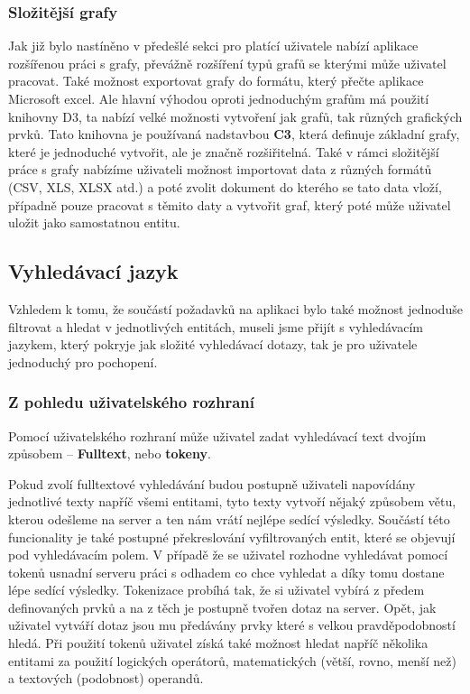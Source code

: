 \subsubsection{Složitější grafy}
\par Jak již bylo nastíněno v předešlé sekci pro platící uživatele nabízí aplikace rozšířenou práci s grafy, převážně rozšíření typů grafů se kterými může uživatel pracovat. Také možnost exportovat grafy do formátu, který přečte aplikace Microsoft excel. Ale hlavní výhodou oproti jednoduchým grafům má použití knihovny D3, ta nabízí velké možnosti vytvoření jak grafů, tak různých grafických prvků. Tato knihovna je používaná nadstavbou \textbf{C3}, která definuje základní grafy, které je jednoduché vytvořit, ale je značně rozšiřitelná. Také v rámci složitější práce s grafy nabízíme uživateli možnost importovat data z různých formátů (CSV, XLS, XLSX atd.) a poté zvolit dokument do kterého se tato data vloží, případně pouze pracovat s těmito daty a vytvořit graf, který poté může uživatel uložit jako samostatnou entitu.

\subsection{Vyhledávací jazyk}
\par Vzhledem k tomu, že součástí požadavků na aplikaci bylo také možnost jednoduše filtrovat a hledat v jednotlivých entitách, museli jsme přijít s vyhledávacím jazykem, který pokryje jak složité vyhledávací dotazy, tak je pro uživatele jednoduchý pro pochopení.

\subsubsection{Z pohledu uživatelského rozhraní}
\par Pomocí uživatelského rozhraní může uživatel zadat vyhledávací text dvojím způsobem -- \textbf{Fulltext}, nebo \textbf{tokeny}.

\par Pokud zvolí fulltextové vyhledávání  budou postupně uživateli napovídány jednotlivé texty napříč všemi entitami, tyto texty vytvoří nějaký způsobem větu, kterou odešleme na server a ten nám vrátí nejlépe sedící výsledky. Součástí této funcionality je také postupné překreslování vyfiltrovaných entit, které se objevují pod vyhledávacím polem. V případě že se uživatel rozhodne vyhledávat pomocí tokenů usnadní serveru práci s odhadem co chce vyhledat a díky tomu dostane lépe sedící výsledky. Tokenizace probíhá tak, že si uživatel vybírá z předem definovaných prvků a na z těch je postupně tvořen dotaz na server. Opět, jak uživatel vytváří dotaz jsou mu předávány prvky které s velkou pravděpodobností hledá. Při použití tokenů uživatel získá také možnost hledat napříč několika entitami za použití logických operátorů, matematických (větší, rovno, menší než) a textových (podobnost) operandů.


